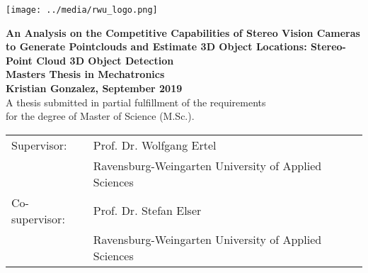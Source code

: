 \pagestyle{empty}
\begin{flushright}
\texttt{[image: ../media/rwu\_logo.png]}
\end{flushright}

\begin{center}
\vspace*{2cm}

\LARGE
\textbf{An Analysis on the Competitive Capabilities of Stereo Vision Cameras to Generate Pointclouds and Estimate 3D Object Locations: Stereo-Point Cloud 3D Object Detection}\\
\Large
\vspace*{2cm}
\noindent \textbf{Masters Thesis in Mechatronics}\\
\vspace*{0.5cm}
\noindent \textbf{Kristian Gonzalez, September 2019}\\
\vspace*{2cm}
\normalsize
A thesis submitted in partial fulfillment of the requirements\\ for the degree
of Master of Science (M.Sc.).

\end{center}

\vspace*{4.5cm}
\begin{tabular}{ll}
Supervisor: & Prof. Dr. Wolfgang Ertel \\
 & Ravensburg-Weingarten University of Applied Sciences\\
Co-supervisor: & Prof. Dr. Stefan Elser\\
 & Ravensburg-Weingarten University of Applied Sciences\\
\end{tabular}

